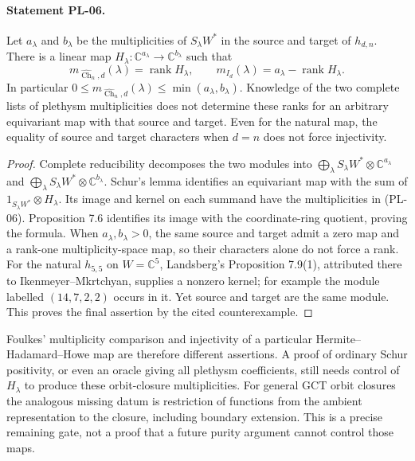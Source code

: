 \documentclass[11pt,a4paper]{article}
\begin{document}
\paragraph{Statement PL-06.}
Let $a_\lambda$ and $b_\lambda$ be the multiplicities of $S_\lambda W^*$
in the source and target of $h_{d,n}$. There is a linear map
$H_\lambda:\mathbb C^{a_\lambda}\to\mathbb C^{b_\lambda}$ such that
\[
 m_{\widehat{\operatorname{Ch}}_n,d}(\lambda)=\operatorname{rank}H_\lambda,
 \qquad
 m_{I_d}(\lambda)=a_\lambda-\operatorname{rank}H_\lambda.
 \tag{PL-06}
\]
In particular $0\leq m_{\widehat{\operatorname{Ch}}_n,d}(\lambda)
\leq\min(a_\lambda,b_\lambda)$. Knowledge of the two complete lists of
plethysm multiplicities does not determine these ranks for an arbitrary
equivariant map with that source and target. Even for the natural map,
the equality of source and target characters when $d=n$ does not force
injectivity.

\begin{proof}
Complete reducibility decomposes the two modules into
$\bigoplus_\lambda S_\lambda W^*\otimes\mathbb C^{a_\lambda}$ and
$\bigoplus_\lambda S_\lambda W^*\otimes\mathbb C^{b_\lambda}$.
Schur's lemma identifies an equivariant map with the sum of
$1_{S_\lambda W^*}\otimes H_\lambda$. Its image and kernel on each
summand have the multiplicities in (PL-06). Proposition 7.6 identifies its
image with the coordinate-ring quotient, proving the formula.
When $a_\lambda,b_\lambda>0$, the same source and target admit a zero map
and a rank-one multiplicity-space map, so their characters alone do not
force a rank. For the natural $h_{5,5}$ on $W=\mathbb C^5$, Landsberg's Proposition 7.9(1),
attributed there to Ikenmeyer--Mkrtchyan, supplies a nonzero kernel; for
example the module labelled $(14,7,2,2)$ occurs in it. Yet source and
target are the same module. This proves the final assertion by the cited
counterexample.
\end{proof}

Foulkes' multiplicity comparison and injectivity of a particular
Hermite--Hadamard--Howe map are therefore different assertions. A proof of
ordinary Schur positivity, or even an oracle giving all plethysm coefficients,
still needs control of $H_\lambda$ to produce these orbit-closure multiplicities.
For general GCT orbit closures the analogous missing datum is restriction
of functions from the ambient representation to the closure, including
boundary extension. This is a precise remaining gate, not a proof that a
future purity argument cannot control those maps.
\end{document}
